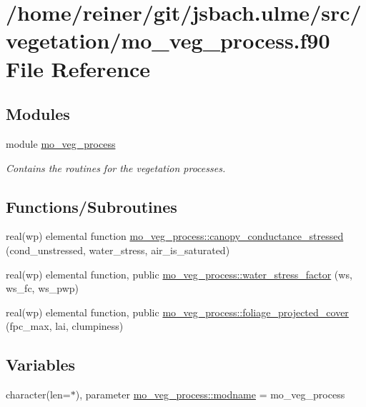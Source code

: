 \hypertarget{mo__veg__process_8f90}{}\section{/home/reiner/git/jsbach.ulme/src/vegetation/mo\+\_\+veg\+\_\+process.f90 File Reference}
\label{mo__veg__process_8f90}
\subsection*{Modules}
\begin{DoxyCompactItemize}
\item 
module \hyperlink{namespacemo__veg__process}{mo\+\_\+veg\+\_\+process}
\begin{DoxyCompactList}\small\item\em Contains the routines for the vegetation processes. \end{DoxyCompactList}\end{DoxyCompactItemize}
\subsection*{Functions/\+Subroutines}
\begin{DoxyCompactItemize}
\item 
real(wp) elemental function \hyperlink{namespacemo__veg__process_ab70d91c72a0af795f8a8a4dcd8687d69}{mo\+\_\+veg\+\_\+process\+::canopy\+\_\+conductance\+\_\+stressed} (cond\+\_\+unstressed, water\+\_\+stress, air\+\_\+is\+\_\+saturated)
\item 
real(wp) elemental function, public \hyperlink{namespacemo__veg__process_a08781664d42770f4962218de89b6387d}{mo\+\_\+veg\+\_\+process\+::water\+\_\+stress\+\_\+factor} (ws, ws\+\_\+fc, ws\+\_\+pwp)
\item 
real(wp) elemental function, public \hyperlink{namespacemo__veg__process_a274a1f4ec71f0e64f08d19c388367d89}{mo\+\_\+veg\+\_\+process\+::foliage\+\_\+projected\+\_\+cover} (fpc\+\_\+max, lai, clumpiness)
\end{DoxyCompactItemize}
\subsection*{Variables}
\begin{DoxyCompactItemize}
\item 
character(len=$\ast$), parameter \hyperlink{namespacemo__veg__process_a38c37cf4dadc4e6507b052eb4357357f}{mo\+\_\+veg\+\_\+process\+::modname} = \textquotesingle{}mo\+\_\+veg\+\_\+process\textquotesingle{}
\end{DoxyCompactItemize}
